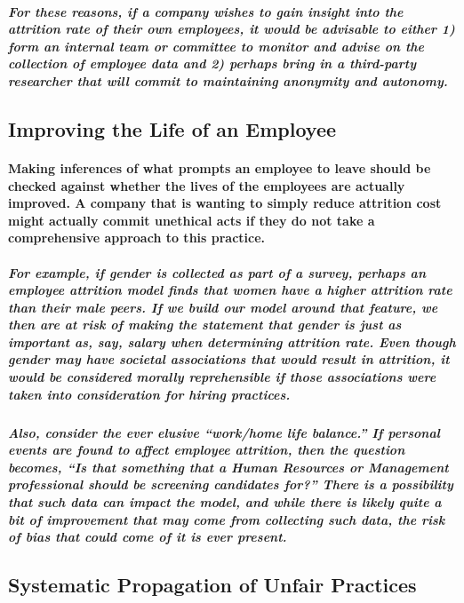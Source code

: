 \documentclass{article}
\begin{document}
\subparagraph{For these reasons, if a company wishes to gain insight into the attrition rate of their own employees, it would be advisable to either 1) form an internal team or committee to monitor and advise on the collection of employee data and 2) perhaps bring in a third-party researcher that will commit to maintaining anonymity and autonomy.}
 
\subsection{Improving the Life of an Employee}

\paragraph{Making inferences of what prompts an employee to leave should be checked against whether the lives of the employees are actually improved. A company that is wanting to simply reduce attrition cost might actually commit unethical acts if they do not take a comprehensive approach to this practice.}

\subparagraph{For example, if gender is collected as part of a survey, perhaps an employee attrition model finds that women have a higher attrition rate than their male peers. If we build our model around that feature, we then are at risk of making the statement that gender is just as important as, say, salary when determining attrition rate. Even though gender may have societal associations that would result in attrition, it would be considered morally reprehensible if those associations were taken into consideration for hiring practices.}
 
\subparagraph{Also, consider the ever elusive “work/home life balance.” If personal events are found to affect employee attrition, then the question becomes, “Is that something that a Human Resources or Management professional should be screening candidates for?” There is a possibility that such data can impact the model, and while there is likely quite a bit of improvement that may come from collecting such data, the risk of bias that could come of it is ever present.}
 
\subsection{Systematic Propagation of Unfair Practices}
\end{document}
